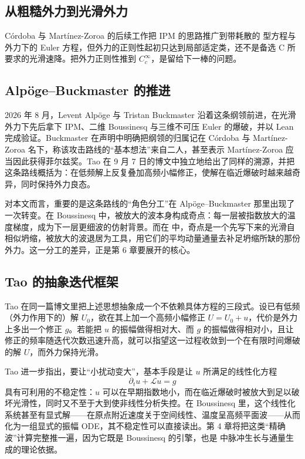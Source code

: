 \subsection{从粗糙外力到光滑外力}

Córdoba 与 Martínez-Zoroa 的后续工作把 IPM 的思路推广到带耗散的 \NS{} 型方程与外力下的 Euler 方程\cite{cmz-euler}，但外力的正则性起初只达到局部适定类，还不是备选 C 所要求的光滑速降。把外力正则性推到 $C_{c}^{\infty}$，是留给下一棒的问题。

\subsection{Alpöge--Buckmaster 的推进}

2026 年 8 月，Levent Alpöge 与 Tristan Buckmaster 沿着这条纲领前进，在光滑外力下先后拿下 IPM、二维 Boussinesq 与三维不可压 Euler 的爆破，并以 Lean 完成验证。Buckmaster 在声明\cite{buckmaster-statement}中明确把纲领的归属记在 Córdoba 与 Martínez-Zoroa 名下，称该攻击路线的“基本想法”来自二人，甚至表示 Martínez-Zoroa 应当因此获得菲尔兹奖。Tao 在 9 月 7 日的博文\cite{tao-blog-sep7}中独立地给出了同样的溯源，并把这条路线概括为：在低频解上反复叠加高频小幅修正，使解在临近爆破时越来越奇异，同时保持外力良态。

对本文而言，重要的是这条路线的“角色分工”在 Alpöge--Buckmaster 那里出现了一次转变。在 Boussinesq 中，被放大的波本身构成奇点：每一层被指数放大的温度梯度，成为下一层更细波的仿射背景。而在 \NS{} 中，奇点是一个先写下来的光滑自相似坍缩，被放大的波退居为工具，用它们的平均动量通量去补足坍缩所缺的那份外力。这一分工的差异，正是第 6 章要展开的核心。

\subsection{Tao 的抽象迭代框架}

Tao 在同一篇博文里把上述思想抽象成一个不依赖具体方程的三段式。设已有低频（外力作用下的）解 $U_{0}$，欲在其上加一个高频小幅修正 $U=U_{0}+u$，代价是外力上多出一个修正 $g$。若能把 $u$ 的振幅做得相对大、而 $g$ 的振幅做得相对小，且让修正的频率随迭代次数迅速升高，就可以指望这一过程收敛到一个在有限时间爆破的解 $U$，而外力保持光滑。

Tao 进一步指出，要让“小扰动变大”，基本手段是让 $u$ 所满足的线性化方程
\begin{equation}
\partial_{t}u+\mathcal{L}u=g
\end{equation}
具有可利用的不稳定性：$u$ 可以在早期指数地小，而在临近爆破时被放大到足以破坏光滑性，同时又不至于大到使非线性分析失控。在 Boussinesq 里，这个线性化系统甚至有显式解——在原点附近速度关于空间线性、温度呈高频平面波——从而化为一组显式的振幅 ODE，其不稳定性可以直接读出。第 4 章将把这类“精确波”计算完整推一遍，因为它既是 Boussinesq 的引擎，也是 \NS{} 中脉冲生长与通量生成的理论依据。

